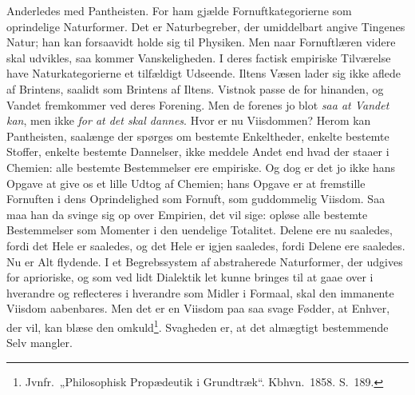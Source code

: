 \documentclass[12pt]{book}
\begin{document}
Anderledes med Pantheisten. For ham gjælde Fornuftkategorierne som
oprindelige Naturformer. Det er Naturbegreber, der umiddelbart
angive Tingenes Natur; han kan forsaavidt holde sig til Physiken.
Men naar Fornuftlæren videre skal udvikles, saa kommer
Vanskeligheden. I deres factisk empiriske Tilværelse have
Naturkategorierne et tilfældigt Udseende. Iltens Væsen lader sig
ikke aflede af Brintens, saalidt som Brintens af Iltens. Vistnok
passe de for hinanden, og Vandet fremkommer ved deres Forening. Men
de forenes jo blot \emph{saa at Vandet kan}, men ikke \emph{for at
det skal dannes}. Hvor er nu Viisdommen? Herom kan Pantheisten,
saalænge der spørges om bestemte Enkeltheder, enkelte bestemte
Stoffer, enkelte bestemte Dannelser, ikke meddele Andet end hvad der
staaer i Chemien: alle bestemte Bestemmelser ere empiriske. Og dog
er det jo ikke hans Opgave at give os et lille Udtog af Chemien;
hans Opgave er at fremstille Fornuften i dens Oprindelighed som
Fornuft, som guddommelig Viisdom. Saa maa han da svinge sig op over
Empirien, det vil sige: opløse alle bestemte Bestemmelser som
Momenter i den uendelige Totalitet. Delene ere nu saaledes, fordi
det Hele er saaledes, og det Hele er igjen saaledes, fordi Delene
ere saaledes. Nu er Alt flydende. I et Begrebssystem af abstraherede
Naturformer, der udgives for aprioriske, og som ved lidt Dialektik
let kunne bringes til at gaae over i hverandre og reflecteres i
hverandre som Midler i Formaal, skal den immanente Viisdom
aabenbares. Men det er en Viisdom paa saa svage Fødder, at Enhver,
der vil, kan blæse den omkuld\footnote{Jvnfr.\ „Philosophisk
Propædeutik i Grundtræk“. Kbhvn.\ 1858. S.\ 189.}. Svagheden er, at
det almægtigt bestemmende Selv mangler.
\end{document}
